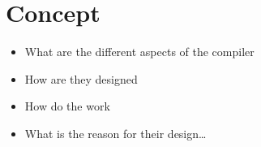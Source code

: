 \chapter{Concept}
\begin{itemize}
    \item What are the different aspects of the compiler
    \item How are they designed
    \item How do the work
    \item What is the reason for their design\dots
\end{itemize}







